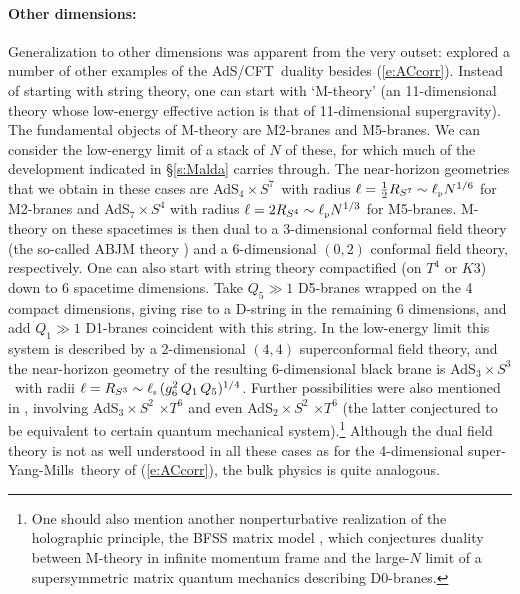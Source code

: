\documentclass[12pt]{article}
\def\sect#1{\S\ref{#1}}
\def\req#1{(\ref{#1})}
\def\AC{AdS/CFT}
\def\SYM{super-Yang-Mills}
\def\lpl{\ell_{\scriptscriptstyle {\rm p}}}
\def\lst{\ell_{\scriptscriptstyle {\rm s}}}
\def\adss#1#2{AdS$_{#1} \times S^{#2}$}
\def\Rads{\ell}
\begin{document}
\paragraph{Other dimensions:}  %
Generalization to other dimensions was apparent from the very outset:  \cite{Maldacena:1997re} explored a number of other examples of the \AC\ duality besides \req{e:ACcorr}.  
Instead of starting with  string theory, one can start with `M-theory' (an 11-dimensional theory whose low-energy effective action is that of 11-dimensional supergravity).  The fundamental objects of M-theory are M2-branes and M5-branes.  We can consider the low-energy limit of a stack of $N$ of these, for which much of the development indicated in \sect{s:Malda} carries through.   The near-horizon geometries that we obtain in these cases are \adss47\ with radius $\Rads = \frac{1}{2} R_{S^7} \sim \lpl N^{1/6}$ for M2-branes and \adss74  with radius $\Rads = 2 R_{S^4} \sim \lpl N^{1/3}$  for M5-branes.   M-theory on these spacetimes is then dual to a 3-dimensional conformal field theory
 (the so-called ABJM theory \cite{Aharony:2008ug}) and a 6-dimensional $(0,2)$ conformal field theory, respectively.
One can also start with string theory compactified (on $T^4$ or $K3$) down to 6 spacetime dimensions.  Take $Q_5 \gg 1$ D5-branes wrapped on the 4 compact dimensions, giving rise to a D-string in the remaining 6 dimensions, and add $Q_1 \gg 1$ D1-branes coincident with this string.  In the low-energy limit this system is described by a 2-dimensional $(4,4)$ superconformal field theory, and the near-horizon geometry of the resulting 6-dimensional black brane is \adss33\ with radii $\Rads = R_{S^3} \sim \lst\, (g_6^2 \, Q_1 \, Q_5)^{1/4}$.  Further possibilities were also mentioned in \cite{Maldacena:1997re}, involving \adss32 $\times T^6$ and even  \adss22 $\times T^6$ (the latter conjectured to be equivalent to certain quantum mechanical system).\footnote{
One should also mention another nonperturbative realization of the holographic principle, the BFSS matrix model \cite{Banks:1996vh}, which conjectures duality between M-theory in infinite momentum frame and the large-$N$ limit of a supersymmetric matrix quantum mechanics describing D0-branes.
}
Although the dual field theory is not as well understood in all these cases as for the 4-dimensional \SYM\ theory of \req{e:ACcorr}, the bulk physics is quite analogous.
\end{document}
